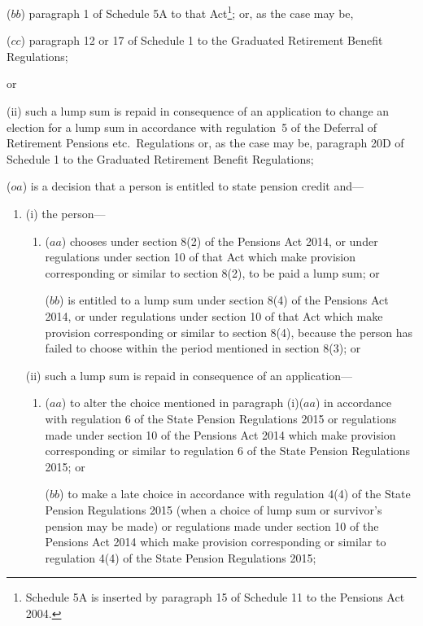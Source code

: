 \documentclass[12pt,a4paper]{article}
\begin{document}
\begin{enumerate}
\begin{enumerate}
\begin{enumerate}
($bb$) paragraph 1 of Schedule 5A to that Act\footnote{Schedule 5A is inserted by paragraph 15 of Schedule 11 to the Pensions Act 2004.}; or, as the case may be,

($cc$) paragraph 12 or 17 of Schedule 1 to the Graduated Retirement Benefit Regulations;
\end{enumerate}
or

(ii) such a lump sum is repaid in consequence of an application to change an election for a lump sum in accordance with regulation~5 of the Deferral of Retirement Pensions etc.\ Regulations or, as the case may be, paragraph 20D of Schedule 1 to the Graduated Retirement Benefit Regulations;
\end{enumerate}

($oa$) is a decision that a person is entitled to state pension credit and—
\begin{enumerate}\item[]
(i) the person—
\begin{enumerate}\item[]
($aa$) chooses under section 8(2) of the Pensions Act 2014, or under regulations under section 10 of that Act which make provision corresponding or similar to section 8(2), to be paid a lump sum; or

($bb$) is entitled to a lump sum under section 8(4) of the Pensions Act 2014, or under regulations under section 10 of that Act which make provision corresponding or similar to section 8(4), because the person has failed to choose within the period mentioned in section 8(3); or
\end{enumerate}

(ii) such a lump sum is repaid in consequence of an application—
\begin{enumerate}\item[]
($aa$) to alter the choice mentioned in paragraph (i)($aa$) in accordance with regulation 6 of the State Pension Regulations 2015 or regulations made under section 10 of the Pensions Act 2014 which make provision corresponding or similar to regulation 6 of the State Pension Regulations 2015; or

($bb$) to make a late choice in accordance with regulation 4(4) of the State Pension Regulations 2015 (when a choice of lump sum or survivor’s pension may be made) or regulations made under section 10 of the Pensions Act 2014 which make provision corresponding or similar to regulation 4(4) of the State Pension Regulations 2015;
\end{enumerate}
\end{enumerate}


\end{enumerate}
\end{document}
